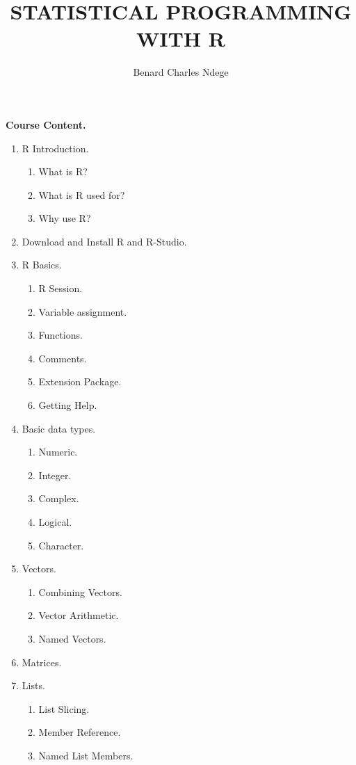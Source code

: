\documentclass[10pt,a4paper]{article}
\author{Benard Charles Ndege}
\title{STATISTICAL PROGRAMMING WITH R}
\begin{document}
	\maketitle
	
	\textbf{\large Course Content.}
	
	\begin{enumerate}
		\item R Introduction.
			\begin{enumerate}
				\item What is R?
				\item What is R used for?
				\item Why use R?
			\end{enumerate}
		\item Download and Install R and R-Studio.
		\item R Basics.
			\begin{enumerate}
				\item R Session.
				\item Variable assignment.
				\item Functions.
				\item Comments.
				\item Extension Package.
				\item Getting Help.
			\end{enumerate}
		\item Basic data types.
			\begin{enumerate}
				\item Numeric.
				\item Integer.
				\item Complex.
				\item Logical.
				\item Character.
			\end{enumerate}
		\item Vectors.
			\begin{enumerate}
				\item Combining Vectors.
				\item Vector Arithmetic.
				\item Named Vectors.
			\end{enumerate}
		\item Matrices.
		\item Lists.
			\begin{enumerate}
				\item List Slicing.
				\item Member Reference.
				\item Named List Members.

\end{enumerate}
\end{enumerate}
\end{document}
